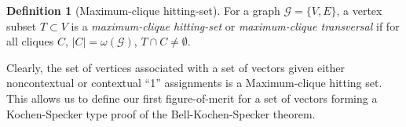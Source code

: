 \documentclass{amsart}
\theoremstyle{definition}
\newtheorem{defn}{Definition}
\begin{document}

\begin{defn}[Maximum-clique hitting-set]
For a graph $\mathcal{G}=\{V,E\}$, a vertex subset $T\subset V$ is a \emph{maximum-clique hitting-set} or \emph{maximum-clique transversal} if for all cliques $C$, $|C|=\omega(\mathcal{G})$, $T\cap C\neq\emptyset$.
\end{defn}

Clearly, the set of vertices associated with a set of vectors given either noncontextual or contextual ``1'' assignments is a Maximum-clique hitting set. This allows us to define our first figure-of-merit for a set of vectors forming a Kochen-Specker type proof of the Bell-Kochen-Specker theorem.
\end{document}
